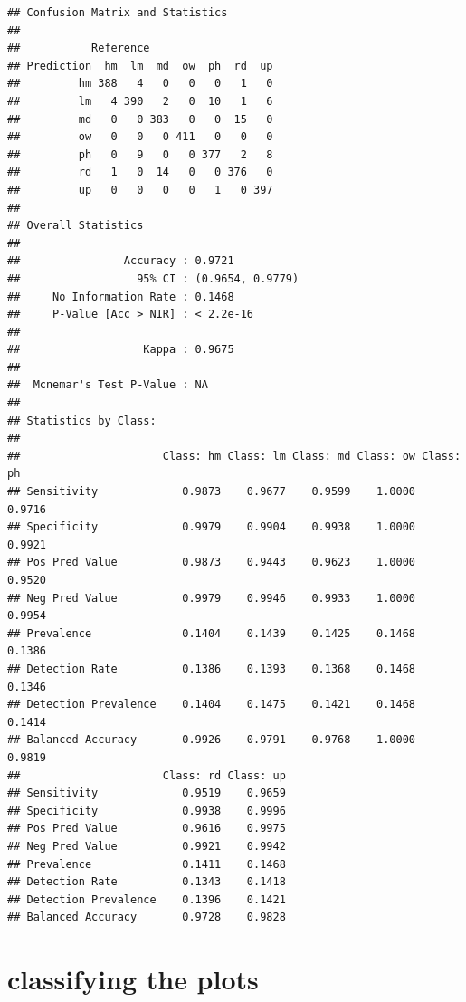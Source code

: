 \documentclass[
]{article}
\newenvironment{Shaded}{\begin{snugshade}}{\end{snugshade}}
\newcommand{\CommentTok}[1]{\textcolor[rgb]{0.56,0.35,0.01}{\textit{#1}}}
\newcommand{\FunctionTok}[1]{\textcolor[rgb]{0.13,0.29,0.53}{\textbf{#1}}}
\newcommand{\NormalTok}[1]{#1}
\newcommand{\SpecialCharTok}[1]{\textcolor[rgb]{0.81,0.36,0.00}{\textbf{#1}}}
\begin{document}
\begin{Shaded}
\end{Shaded}

\begin{verbatim}
## Confusion Matrix and Statistics
## 
##           Reference
## Prediction  hm  lm  md  ow  ph  rd  up
##         hm 388   4   0   0   0   1   0
##         lm   4 390   2   0  10   1   6
##         md   0   0 383   0   0  15   0
##         ow   0   0   0 411   0   0   0
##         ph   0   9   0   0 377   2   8
##         rd   1   0  14   0   0 376   0
##         up   0   0   0   0   1   0 397
## 
## Overall Statistics
##                                           
##                Accuracy : 0.9721          
##                  95% CI : (0.9654, 0.9779)
##     No Information Rate : 0.1468          
##     P-Value [Acc > NIR] : < 2.2e-16       
##                                           
##                   Kappa : 0.9675          
##                                           
##  Mcnemar's Test P-Value : NA              
## 
## Statistics by Class:
## 
##                      Class: hm Class: lm Class: md Class: ow Class: ph
## Sensitivity             0.9873    0.9677    0.9599    1.0000    0.9716
## Specificity             0.9979    0.9904    0.9938    1.0000    0.9921
## Pos Pred Value          0.9873    0.9443    0.9623    1.0000    0.9520
## Neg Pred Value          0.9979    0.9946    0.9933    1.0000    0.9954
## Prevalence              0.1404    0.1439    0.1425    0.1468    0.1386
## Detection Rate          0.1386    0.1393    0.1368    0.1468    0.1346
## Detection Prevalence    0.1404    0.1475    0.1421    0.1468    0.1414
## Balanced Accuracy       0.9926    0.9791    0.9768    1.0000    0.9819
##                      Class: rd Class: up
## Sensitivity             0.9519    0.9659
## Specificity             0.9938    0.9996
## Pos Pred Value          0.9616    0.9975
## Neg Pred Value          0.9921    0.9942
## Prevalence              0.1411    0.1468
## Detection Rate          0.1343    0.1418
## Detection Prevalence    0.1396    0.1421
## Balanced Accuracy       0.9728    0.9828
\end{verbatim}

\section{classifying the plots}\label{classifying-the-plots}
\end{document}
